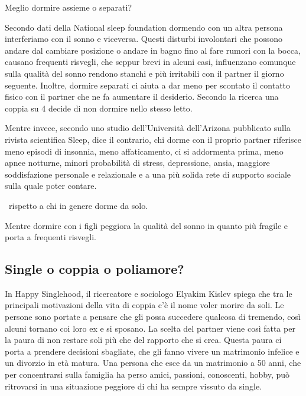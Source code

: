 \documentclass[12pt]{book} %
\begin{document}
\begin{mdframed}[linewidth=1pt]
Meglio dormire assieme o separati? 

Secondo dati della National sleep foundation dormendo con un altra persona interferiamo con il sonno e viceversa. Questi
disturbi involontari che possono andare dal cambiare posizione o andare in bagno fino al fare rumori con la bocca,
causano frequenti risvegli, che seppur brevi in alcuni casi, influenzano comunque sulla qualità del sonno rendono
stanchi e più irritabili con il partner il giorno seguente. Inoltre, dormire separati ci aiuta a dar meno per scontato
il contatto fisico con il partner che ne fa aumentare il desiderio. Secondo la ricerca una coppia su 4 decide di non
dormire nello stesso letto.

Mentre invece, secondo uno studio dell'Università dell'Arizona pubblicato sulla rivista scientifica
Sleep, dice il contrario, chi
dorme con il proprio partner riferisce meno episodi di insonnia, meno affaticamento, ci si addormenta prima, meno apnee
notturne, minori probabilità di stress, depressione, ansia, maggiore soddisfazione personale e relazionale e a una più
solida rete di supporto sociale sulla quale poter contare. 

\ rispetto a chi in genere dorme da solo.

Mentre dormire con i figli peggiora la qualità del sonno in quanto più fragile e porta a frequenti risvegli.
\end{mdframed}

\subsection{Single o coppia o poliamore?}
In Happy Singlehood, il ricercatore e sociologo Elyakim Kislev spiega che
tra le principali motivazioni della vita di coppia c'è il nome voler morire da soli. Le persone
sono portate a pensare che gli possa succedere qualcosa di tremendo, così alcuni tornano coi loro ex e si sposano. La
scelta del partner viene così fatta per la paura di non restare soli più che del rapporto che si crea. Questa paura ci
porta a prendere decisioni sbagliate, che gli fanno vivere un matrimonio infelice e un divorzio in età matura. Una
persona che esce da un matrimonio a 50 anni, che per concentrarsi sulla famiglia ha perso amici, passioni, conoscenti,
hobby, può ritrovarsi in una situazione peggiore di chi ha sempre vissuto da single.
\end{document}
